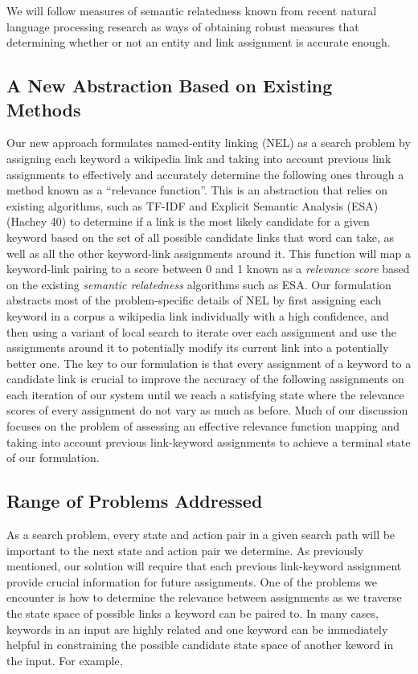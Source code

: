 \documentclass[twoside,11pt]{article}
\begin{document}
We will follow measures of semantic relatedness known from recent natural language processing research as ways of obtaining robust measures that determining whether or not an entity and link assignment is accurate enough.

\subsection{A New Abstraction Based on Existing Methods}

Our new approach formulates named-entity linking (NEL) as a search problem by assigning each keyword a wikipedia link and taking into account previous link assignments to effectively and accurately determine the following ones through a method known as a “relevance function”. This is an abstraction that relies on existing algorithms, such as TF-IDF and Explicit Semantic Analysis (ESA) (Hachey 40) to determine if a link is the most likely candidate for a given keyword based on the set of all possible candidate links that word can take, as well as all the other keyword-link assignments around it. This function will map a keyword-link pairing to a score between 0 and 1 known as a \textit{relevance score} based on the existing \textit{semantic relatedness} algorithms such as ESA. Our formulation abstracts most of the problem-specific details of NEL by first assigning each keyword in a corpus a wikipedia link individually with a high confidence, and then using a variant of local search to iterate over each assignment and use the assignments around it to potentially modify its current link into a potentially better one. The key to our formulation is that every assignment of a keyword to a candidate link is crucial to improve the accuracy of the following assignments on each iteration of our system until we reach a satisfying state where the relevance scores of every assignment do not vary as much as before. Much of our discussion focuses on the problem of assessing an effective relevance function mapping and taking into account previous link-keyword assignments to achieve a terminal state of our formulation.

\subsection{Range of Problems Addressed}

As a search problem, every state and action pair in a given search path will be important to the next state and action pair we determine. As previously mentioned, our solution will require that each previous link-keyword assignment provide crucial information for future assignments. One of the problems we encounter is how to determine the relevance between assignments as we traverse the state space of possible links a keyword can be paired to. In many cases, keywords in an input are highly related and one keyword can be immediately helpful in constraining the possible candidate state space of another keword in the input. For example,
\end{document}

